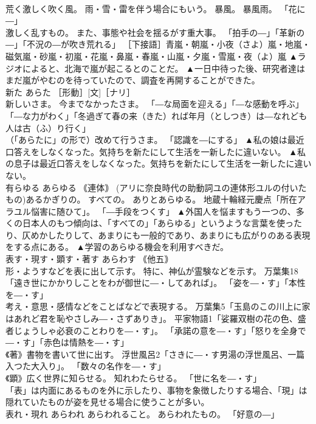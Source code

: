 \documentclass[8pt]{extreport}
\begin{document}
\begin{CJK}{UTF8}{min}
\\	荒く激しく吹く風。 雨・雪・雷を伴う場合にもいう。 暴風。 暴風雨。 「花に―」 
\\	激しく乱すもの。 また、事態や社会を揺るがす重大事。 「拍手の―」「革新の―」「不況の―が吹き荒れる」 ［下接語］青嵐・朝嵐・小夜（さよ）嵐・地嵐・磁気嵐・砂嵐・初嵐・花嵐・鼻嵐・春嵐・山嵐・夕嵐・雪嵐・夜（よ）嵐	▲ラジオによると、北海で嵐が起こるとのことだ。 ▲一日中待った後、研究者達はまだ嵐がやむのを待っていたので、調査を再開することができた。
\\	新た	あらた	［形動］[文]［ナリ］ 
\\	新しいさま。 今までなかったさま。 「―な局面を迎える」「―な感動を呼ぶ」「―な力がわく」「冬過ぎて春の来（きた）れば年月（としつき）は―なれども人は古（ふ）り行く」 
\\	（「あらたに」の形で）改めて行うさま。 「認識を―にする」	▲私の娘は最近口答えをしなくなった。気持ちを新たにして生活を一新したに違いない。 ▲私の息子は最近口答えをしなくなった。気持ちを新たにして生活を一新したに違いない。
\\	有らゆる	あらゆる	｟連体｠ (アリに奈良時代の助動詞ユの連体形ユルの付いたもの)あるかぎりの。 すべての。 ありとあらゆる。 地蔵十輪経元慶点「所在アラユル悩害に随ひて」。 「―手段をつくす」	▲外国人を悩ますもう一つの、多くの日本人のもつ傾向は、「すべての」「あらゆる」というような言葉を使ったり、仄めかしたりして、あまりにも一般的であり、あまりにも広がりのある表現をする点にある。 ▲学習のあらゆる機会を利用すべきだ。
\\	表す・現す・顕す・著す	あらわす	｟他五｠ 
\\	形・ようすなどを表に出して示す。 特に、神仏が霊験などを示す。 万葉集18「遠き世にかかりしことをわが御世に―・してあれば」。 「姿を―・す」「本性を―・す」 
\\	考え・意思・感情などをことばなどで表現する。 万葉集5「玉島のこの川上に家はあれど君を恥やさしみ―・さずありき」。 平家物語1「娑羅双樹の花の色、盛者じょうしゃ必衰のことわりを―・す」。 「承諾の意を―・す」「怒りを全身で―・す」「赤色は情熱を―・す」 
\\	《著》書物を書いて世に出す。 浮世風呂2「さきに―・す男湯の浮世風呂、一篇入つた大入り」。 「数々の名作を―・す」 
\\	《顕》広く世界に知らせる。 知れわたらせる。 「世に名を―・す」 
\\	「表」は内面にあるものを外に示したり、事物を象徴したりする場合、「現」は隠れていたものが姿を見せる場合に使うことが多い。	
\\	表れ・現れ	あらわれ	あらわれること。 あらわれたもの。 「好意の―」	

\end{CJK}
\end{document}
